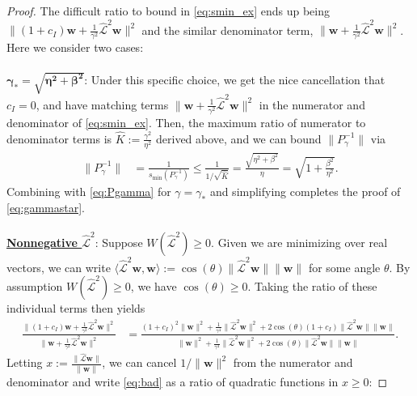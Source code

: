 \documentclass[review]{siamart}
\begin{document}
\begin{proof}
The difficult ratio to bound in \eqref{eq:smin_ex} ends up being 
$\|(1+c_I)\mathbf{w}+\tfrac{1}{\gamma^2}\widehat{\mathcal{L}}^2\mathbf{w}\|^2$ and the
similar denominator term, $\|\mathbf{w}+\tfrac{1}{\gamma^2}\widehat{\mathcal{L}}^2\mathbf{w}\|^2$.
Here we consider two cases:\\
\\
\underline{$\boldsymbol{\gamma_* = \sqrt{\eta^2+\beta^2}}$}: Under this specific choice, we
get the nice cancellation that $c_I = 0$, and have matching terms
$\|\mathbf{w}+\tfrac{1}{\gamma^2}\widehat{\mathcal{L}}^2\mathbf{w}\|^2$ in the numerator
and denominator of \eqref{eq:smin_ex}. Then, the maximum ratio of numerator 
to denominator terms is $\widehat{K} := \tfrac{\gamma^2}{\eta^2}$ derived above,
and we can bound $\|P_{\gamma}^{-1}\|$ via
%
\begin{align}\label{eq:gammas_bound}
\|P_{\gamma}^{-1}\| & = \frac{1}{s_{\min}(P_{\gamma}^{-1})} 
	\leq \frac{1}{1/\sqrt{\widehat{K}}} 
	= \frac{\sqrt{\eta^2+\beta^2}}{\eta} =
	\sqrt{1+\frac{\beta^2}{\eta^2}}.
\end{align}
%
Combining with \eqref{eq:Pgamma} for $\gamma = \gamma_*$ and simplifying
completes the proof of \eqref{eq:gammastar}.\\
\\
\noindent
\underline{\textbf{Nonnegative $\widehat{\mathcal{L}}^2$}}: Suppose
$W(\widehat{\mathcal{L}}^2) \geq 0$.
Given we are minimizing over real vectors, we can write $\langle\widehat{\mathcal{L}}^2\mathbf{w},
\mathbf{w} \rangle := \cos(\theta)\|\widehat{\mathcal{L}}^2\mathbf{w}\|\|\mathbf{w}\|$ for some
angle $\theta$. By assumption $W(\widehat{\mathcal{L}}^2) \geq 0$, we have $\cos(\theta)\geq 0$.
Taking the ratio of these individual terms then yields
%
{\small
\begin{align}\label{eq:bad}
\frac{\|(1+c_I)\mathbf{w}+\tfrac{1}{\gamma^2}\widehat{\mathcal{L}}^2\mathbf{w}\|^2}
	{\|\mathbf{w}+\tfrac{1}{\gamma^2}\widehat{\mathcal{L}}^2\mathbf{w}\|^2}
& = \frac{(1+c_I)^2\|\mathbf{w}\|^2+\tfrac{1}{\gamma^4}\|\widehat{\mathcal{L}}^2\mathbf{w}\|^2
	+ 2\cos(\theta)(1+c_I)\|\widehat{\mathcal{L}}^2\mathbf{w}\|\|\mathbf{w}\|}
	{\|\mathbf{w}\|^2+\tfrac{1}{\gamma^4}\|\widehat{\mathcal{L}}^2\mathbf{w}\|^2
	+ 2\cos(\theta)\|\widehat{\mathcal{L}}^2\mathbf{w}\|\|\mathbf{w}\|}.
\end{align}
}
%
Letting $x := \tfrac{\|\widehat{\mathcal{L}}\mathbf{w}\|}{\|\mathbf{w}\|}$, we can
cancel $1/\|\mathbf{w}\|^2$ from the numerator and denominator and
write \eqref{eq:bad} as a ratio of quadratic functions in $x \geq 0$:

\end{proof}
\end{document}
